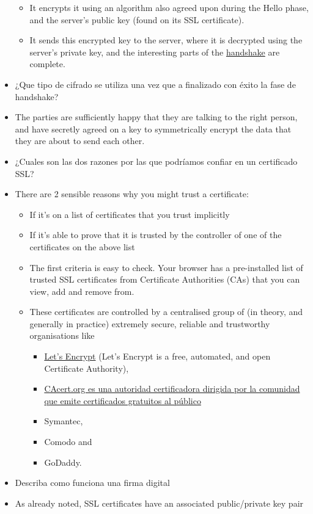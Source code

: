 \begin{itemize}
  \begin{itemize}
  \itemsep1pt\parskip0pt
  \item
    It encrypts it using an algorithm also agreed upon during the Hello
    phase, and the server's public key (found on its SSL certificate).
  \item
    It sends this encrypted key to the server, where it is decrypted
    using the server's private key, and the interesting parts of the
    \href{http://www.dictionary.com/browse/handshake}{handshake} are
    complete.
  \end{itemize}
\item
  ¿Que tipo de cifrado se utiliza una vez que a finalizado con éxito la
  fase de handshake?
\item
  The parties are sufficiently happy that they are talking to the right
  person, and have secretly agreed on a key to symmetrically encrypt the
  data that they are about to send each other.
\item
  ¿Cuales son las dos razones por las que podríamos confiar en un
  certificado SSL?
\item
  There are 2 sensible reasons why you might trust a certificate:

  \begin{itemize}
  \itemsep1pt\parskip0pt
  \item
    If it's on a list of certificates that you trust implicitly
  \item
    If it's able to prove that it is trusted by the controller of one of
    the certificates on the above list
  \item
    The first criteria is easy to check. Your browser has a
    pre-installed list of trusted SSL certificates from Certificate
    Authorities (CAs) that you can view, add and remove from.
  \item
    These certificates are controlled by a centralised group of (in
    theory, and generally in practice) extremely secure, reliable and
    trustworthy organisations like

    \begin{itemize}
    \itemsep1pt\parskip0pt
    \item
      \href{https://letsencrypt.org/}{Let's Encrypt} (Let's Encrypt is a
      free, automated, and open Certificate Authority),
    \item
      \href{http://www.cacert.org/}{CAcert.org es una autoridad
      certificadora dirigida por la comunidad que emite certificados
      gratuitos al público}
    \item
      Symantec,
    \item
      Comodo and
    \item
      GoDaddy.
    \end{itemize}
  \end{itemize}
\item
  Describa como funciona una firma digital
\item
  As already noted, SSL certificates have an associated public/private
  key pair


\end{itemize}
